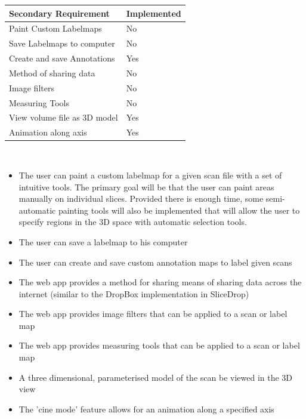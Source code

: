 \documentclass[a4paper,11pt,titlepage]{article}
\begin{document}
\begin{center}

  \begin{tabular}{| l | l |}
    \hline
    Secondary Requirement & Implemented \\ \hline \hline
	Paint Custom Labelmaps & No\\ \hline
	Save Labelmaps to computer & No \\ \hline
	Create and save Annotations & Yes \\ \hline
	Method of sharing data & No \\ \hline
	Image filters & No \\ \hline
	Measuring Tools & No \\ \hline
	View volume file as 3D model & Yes \\ \hline
	Animation along axis & Yes \\ \hline



  \end{tabular}\\
\end{center}



\begin{itemize}
\item The user can paint a custom labelmap for a given scan file with a set of intuitive tools. The primary goal will be that the user can paint areas manually on individual slices. Provided there is enough time, some semi-automatic painting tools will also be implemented that will allow the user to specify regions in the 3D space with automatic selection tools. 
\item The user can save a labelmap to his computer
\item The user can create and save custom annotation maps to label given scans
\item The web app provides a method for sharing  means of sharing data across the internet (similar to the DropBox implementation in SliceDrop)
\item The web app provides image filters that can be applied to a scan or label map
\item The web app provides measuring tools that can be applied to a scan or label map
\item A three dimensional, parameterised model of the scan be viewed in the 3D view
\item The 'cine mode' feature allows for an animation along a specified axis
\end{itemize}
\end{document}
